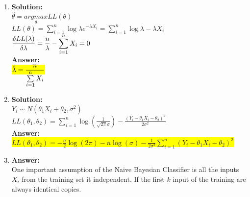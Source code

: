 \documentclass{article}
\newcommand{\myansw}{\textbf{Answer:}\\}
\newcommand{\mysolu}{\textbf{Solution:}\\}
\begin{document}
\thispagestyle{fancy} %

\begin{enumerate}
	\item

	\mysolu
	$\hat{\theta} = \underset{\theta}{argmax}LL(\theta)$\\
	$LL(\theta) = \sum\limits_{i = 1}^{n} \log\lambda e^{-\lambda X_i}=\sum\limits_{i = 1}^{n} \log\lambda -\lambda X_i$\\
	$\mathlarger{\frac{\delta LL(\lambda)}{\delta \lambda} = \frac{n}{\lambda}-\sum\limits_{i = 1}^{n}X_i} = 0$\\
	\myansw
	\colorbox{yellow}{$\mathlarger{\hat{\lambda} = \frac{n}{\sum\limits_{i = 1}^{n}X_i}}$}\\
	\item
	\mysolu
	$Y_i \sim N(\theta_1 X_i + \theta_2, \sigma^2)$\\
	$LL(\theta_1, \theta_2) = \sum\limits_{i = 1}^{n} \log(\frac{1}{\sqrt{2\pi} \sigma}) - \frac{(Y_i - \theta_1 X_i - \theta_2)^2}{2 \sigma^2}$\\
	\myansw
	\colorbox{yellow}{$LL(\theta_1, \theta_2) = -\frac{n}{2} \log(2\pi ) - n\log(\sigma) - \frac{1}{2 \sigma^2}\sum\limits_{i = 1}^{n}(Y_i - \theta_1 X_i - \theta_2)^2$}\\
	\item
	\myansw
	One important assumption of the Naive Bayesian Classifier is all the inputs $X_i$ from the training set it independent. If the first $k$ input of the training are always identical copies.
	

\end{enumerate}
\end{document}
